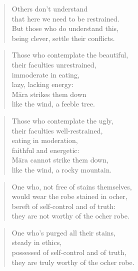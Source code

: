 \documentclass[12pt,openany]{book}%
\begin{document}
\begin{verse}%
Others don’t understand \\
that here we need to be restrained. \\
But those who do understand this, \\
being clever, settle their conflicts. 

%
\end{verse}

\begin{verse}%
Those who contemplate the beautiful, \\
their faculties unrestrained, \\
immoderate in eating, \\
lazy, lacking energy: \\
\textsanskrit{Māra} strikes them down \\
like the wind, a feeble tree. 

%
\end{verse}

\begin{verse}%
Those who contemplate the ugly, \\
their faculties well-restrained, \\
eating in moderation, \\
faithful and energetic: \\
\textsanskrit{Māra} cannot strike them down, \\
like the wind, a rocky mountain. 

%
\end{verse}

\begin{verse}%
One who, not free of stains themselves, \\
would wear the robe stained in ocher, \\
bereft of self-control and of truth: \\
they are not worthy of the ocher robe. 

%
\end{verse}

\begin{verse}%
One who’s purged all their stains, \\
steady in ethics, \\
possessed of self-control and of truth, \\
they are truly worthy of the ocher robe. 

%
\end{verse}
\end{document}
